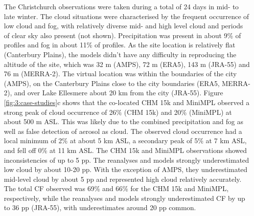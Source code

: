 The Christchurch observations were taken during a total of 24 days in mid-
to late winter. The cloud situations were characterised by the frequent occurrence of low cloud
and fog, with relatively diverse mid- and high level cloud and periods of clear
sky also present (not shown). Precipitation was present in about 9\% of profiles and fog
in about 11\% of profiles. As the site location is relatively flat
(Canterbury Plains), the models didn't have any difficulty in reproducing the
altitude of the site, which was 32 m (AMPS), 72 m (ERA5), 143 m (JRA-55) and
76 m (MERRA-2). The virtual location was within the boundaries of the city
(AMPS), on the Canterbury Plains close to the city boundaries (ERA5, MERRA-2),
and over Lake Ellesmere about 20 km from the city (JRA-55).
Figure \ref{fig:3:case-studies}c shows that the co-located CHM 15k and MiniMPL
observed a strong peak of cloud occurrence of 26\% (CHM 15k) and 20\% (MiniMPL) at about 500 m ASL. This was
likely due to the combined precipitation and fog as well as false detection
of aerosol as cloud. The observed cloud occurrence
had a local minimum of 2\% at about 5 km ASL, a secondary peak of
5\% at 7 km ASL, and fell off 0\% at 11 km ASL.
The CHM 15k and MiniMPL observations showed inconsistencies
of up to 5 pp. The reanalyses and
models strongly underestimated low cloud by about 10-20 pp. With the
exception of AMPS, they underestimated mid-level cloud by about 5 pp and
represented high cloud relatively accurately.
The total CF observed was 69\% and 66\% for the
CHM 15k and MiniMPL, respectively, while the reanalyses and models strongly
underestimated CF by up to 36 pp (JRA-55), with
underestimates around 20 pp common.

